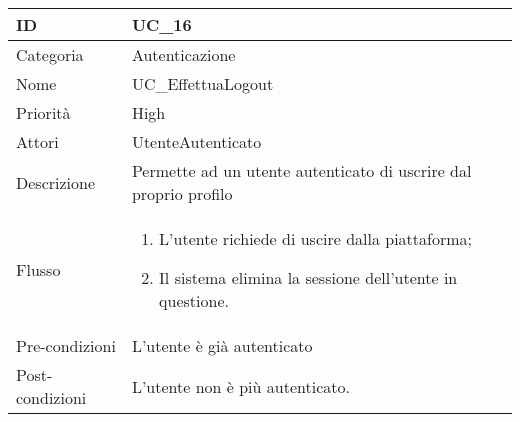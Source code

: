 \begin{center}
\begin{tabular}{ |p{2cm}|p{13cm}|  }
\hline
ID & UC\_16\\\hline
Categoria & Autenticazione \\\hline
Nome & UC\_EffettuaLogout \\\hline
Priorità & High \\\hline
Attori &  UtenteAutenticato \\\hline
Descrizione & Permette ad un utente autenticato di uscrire dal proprio profilo \\\hline
Flusso &  	\begin{enumerate}
			\item L'utente richiede di uscire dalla piattaforma;
			\item Il sistema elimina la sessione dell'utente in questione.
		\end{enumerate}\\\hline
Pre-condizioni &  L'utente è già autenticato\\\hline
Post-condizioni &  L'utente non è più autenticato.\\\hline
\end{tabular}
\label{table_use_case:16}\newline



\end{center}
